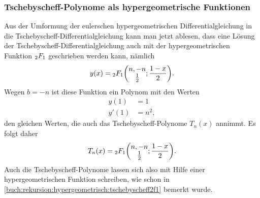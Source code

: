 \subsubsection{Tschebyscheff-Polynome als hypergeometrische Funktionen}
Aus der Umformung der eulerschen hypergeometrischen Differentialgleichung
in die Tschebyscheff-Differentialgleichung kann man jetzt ablesen, dass
eine Lösung der Tschebyscheff-Differential\-glei\-chung auch mit der
hypergeometrischen Funktion $\mathstrut_2F_1$ geschrieben werden kann,
nämlich
\[
y(x)
=
\mathstrut_2F_1\biggl(
\begin{matrix}
n,-n\\
\frac12
\end{matrix};\frac{1-x}2
\biggr).
\]
Wegen $b=-n$ ist diese Funktion ein Polynom mit den Werten
\[
\begin{aligned}
y(1) &= 1 \\
y'(1)&= n^2,
\end{aligned}
\]
den gleichen Werten, die auch das Tschebyscheff-Polynome $T_n(x)$ annimmt.
Es folgt daher
\begin{equation}
T_n(x)
=
\mathstrut_2F_1\biggl(
\begin{matrix}n,-n\\\frac12\end{matrix};
\frac{1-x}2
\biggr).
\end{equation}
Auch die Tschebyscheff-Polynome lassen sich also mit Hilfe einer
hypergeometrischen Funktion schreiben, wie schon in
\eqref{buch:rekursion:hypergeometrisch:tschebyscheff2f1}
bemerkt wurde.

